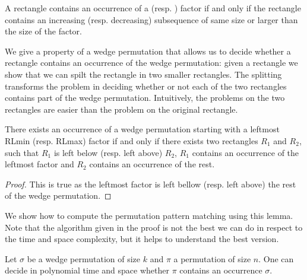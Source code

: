 \documentclass[a4paper]{llncs}
\newcommand{\RLMin}{\text{RLMin}\xspace}
\newcommand{\RLMax}{\text{RLMax}\xspace}
\begin{document}
\begin{remark}
A rectangle contains
an occurrence of a \RLMin (resp. \RLMax) factor if and only if
the rectangle contains an increasing (resp. decreasing) subsequence
of same size or larger than the size of the factor.
\end{remark}

We give a property of a wedge permutation that
allows us to decide whether a rectangle
contains an occurrence of the wedge permutation:
given a rectangle we show that we can spilt the
rectangle in two smaller rectangles.
The splitting transforms the problem
in deciding whether or not each of the two rectangles
contains part of the wedge permutation.
Intuitively, the problems on the two rectangles
are easier than the problem on the original rectangle.

\begin{lemma}
There exists an occurrence of a wedge permutation
starting with a leftmost RLmin (resp. RLmax) factor
if and only if
there exists two rectangles $R_1$ and $R_2$,
such that $R_1$ is left below (resp. left above) $R_2$,
$R_1$ contains an occurrence of the leftmost factor
and $R_2$ contains an occurrence of the rest.
\end{lemma}

\begin{proof}
This is true as the leftmost factor is left bellow (resp. left above)
the rest of the wedge permutation.
\end{proof}

We show how to compute the permutation pattern matching
using this lemma. Note that the algorithm given in the proof is not the best we can do
in respect to the time and space complexity,
but it helps to understand the best version.

\begin{lemma}
Let $\sigma$ be a wedge permutation of size $k$
and $\pi$ a permutation of size $n$.
One can decide in polynomial time and space whether
$\pi$ contains an occurrence $\sigma$.
\end{lemma}
\end{document}
